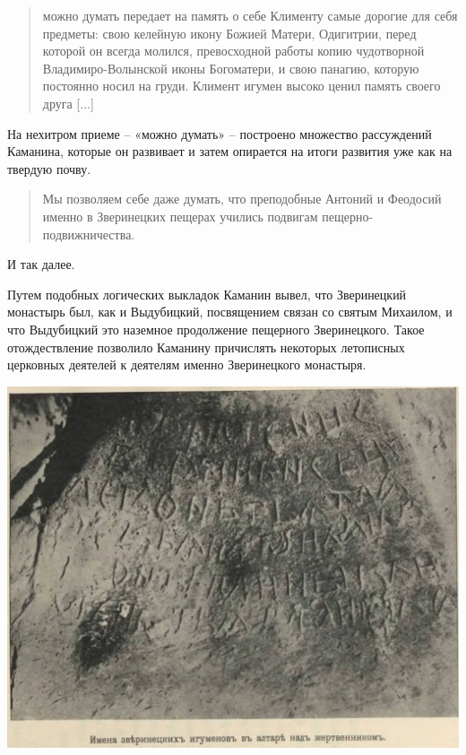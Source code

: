 \begin{quotation}
можно думать передает на память о себе Клименту самые дорогие для себя предметы: свою келейную икону Божией Матери, Одигитрии, перед которой он всегда молился, превосходной работы копию чудотворной Владимиро-Волынской иконы Богоматери, и свою панагию, которую постоянно носил на груди. Климент игумен высоко ценил память своего друга [...]
\end{quotation}

На нехитром приеме – «можно думать» –  построено множество рассуждений Каманина, которые он развивает и затем опирается на итоги развития уже как на твердую почву. 

\begin{quotation}
Мы позволяем себе даже думать, что преподобные Антоний и Феодосий именно в Зверинецких пещерах учились подвигам пещерно-по\-движничес\-тва.
\end{quotation}

И так далее.

Путем подобных логических выкладок Каманин вывел, что Зверинецкий монастырь был, как и Выдубицкий, посвящением связан со святым Михаилом, и что Выдубицкий это наземное продолжение пещерного Зверинецкого. Такое отождествление позволило Каманину причислять некоторых летописных церковных деятелей к деятелям именно Зверинецкого монастыря.

\vspace*{\fill}
\begin{center}
\includegraphics[width=\linewidth]{chast-colebanie-osnov/nachalo/zverp-04.jpg}
\end{center}

